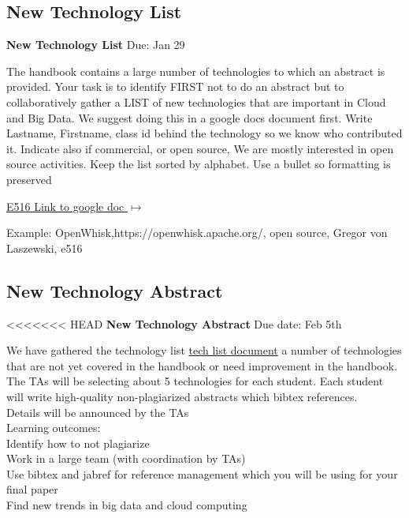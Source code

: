 \subsection{New Technology List}

\begin{exercise} \label{a:e516-new-tech-list}

{\bf New Technology List} Due: Jan 29

The handbook contains a large number of technologies to which an abstract is provided. Your task is to identify FIRST not to do an abstract but to collaboratively gather a LIST of new technologies that are important in Cloud and Big Data. We suggest doing this in a google docs document first. Write Lastname, Firstname, class id behind the technology so we know who contributed it. Indicate also if commercial, or open source, We are mostly interested in open source activities. Keep the list sorted by alphabet. Use a bullet so formatting is preserved

 
{\hfill \href{https://docs.google.com/document/d/1LeHGHTSBbaPXYVor0efhmi5W7JJjS7EQHABHqgRAPuU/edit?usp=sharing}{E516 Link to google doc $\mapsto$}}
 
Example: OpenWhisk,https://openwhisk.apache.org/, open source, Gregor von Laszewski, e516
 
\end{exercise}

\subsection{New Technology Abstract}

\begin{exercise} \label{a:e516-new-tech-abstracts}

<<<<<<< HEAD
{\bf New Technology Abstract}
Due date: Feb 5th

We have gathered the technology list \href{https://piazza.com/class/jbkvbp3ed3m2ez?cid=50}{tech list document} a number of technologies that are not yet covered in the handbook or need improvement in the handbook.\\

The TAs will be selecting about 5 technologies for each student. Each student will write high-quality non-plagiarized abstracts which bibtex references.\\
 
Details will be announced by the TAs\\
 
Learning outcomes:\\

\noindent Identify how to not plagiarize\\
Work in a large team (with coordination by TAs)\\
Use bibtex and jabref for reference management which you will be using for your final paper\\
Find new trends in big data and cloud computing\\

\end{exercise}

